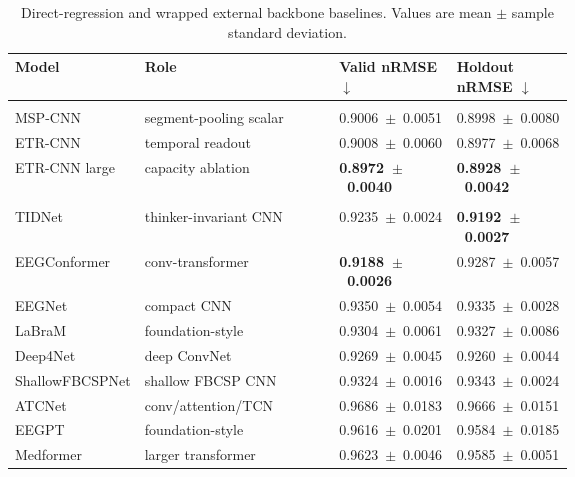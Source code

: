 \documentclass[12pt]{article}
\begin{document}
\begin{table}[!t]
\centering
\caption{Direct-regression and wrapped external backbone baselines. Values are mean $\pm$ sample standard deviation.}
\label{tab:r11_regression_baselines}
\footnotesize
\setlength{\tabcolsep}{2pt}
\renewcommand{\arraystretch}{1.15}
\begin{tabularx}{\linewidth}{@{} >{\RaggedRight\arraybackslash}p{0.22\linewidth} Y >{\centering\arraybackslash}p{0.215\linewidth} >{\centering\arraybackslash}p{0.215\linewidth} @{}}
\toprule
\textbf{Model} & \textbf{Role} & \textbf{Valid nRMSE} $\downarrow$ & \textbf{Holdout nRMSE} $\downarrow$ \\
\midrule
{} \\
\addlinespace[0.15em]
MSP-CNN & segment-pooling scalar & \mbox{0.9006 $\pm$ 0.0051} & \mbox{0.8998 $\pm$ 0.0080} \\
ETR-CNN & temporal readout & \mbox{0.9008 $\pm$ 0.0060} & \mbox{0.8977 $\pm$ 0.0068} \\
ETR-CNN large & capacity ablation & \textbf{\mbox{0.8972 $\pm$ 0.0040}} & \textbf{\mbox{0.8928 $\pm$ 0.0042}} \\
\midrule
{} \\
\addlinespace[0.15em]
TIDNet & thinker-invariant CNN & \mbox{0.9235 $\pm$ 0.0024} & \textbf{\mbox{0.9192 $\pm$ 0.0027}} \\
EEGConformer & conv-transformer & \textbf{\mbox{0.9188 $\pm$ 0.0026}} & \mbox{0.9287 $\pm$ 0.0057} \\
EEGNet & compact CNN & \mbox{0.9350 $\pm$ 0.0054} & \mbox{0.9335 $\pm$ 0.0028} \\
LaBraM & foundation-style & \mbox{0.9304 $\pm$ 0.0061} & \mbox{0.9327 $\pm$ 0.0086} \\
Deep4Net & deep ConvNet & \mbox{0.9269 $\pm$ 0.0045} & \mbox{0.9260 $\pm$ 0.0044} \\
ShallowFBCSPNet & shallow FBCSP CNN & \mbox{0.9324 $\pm$ 0.0016} & \mbox{0.9343 $\pm$ 0.0024} \\
ATCNet & conv/attention/TCN & \mbox{0.9686 $\pm$ 0.0183} & \mbox{0.9666 $\pm$ 0.0151} \\
EEGPT & foundation-style & \mbox{0.9616 $\pm$ 0.0201} & \mbox{0.9584 $\pm$ 0.0185} \\
Medformer & larger transformer & \mbox{0.9623 $\pm$ 0.0046} & \mbox{0.9585 $\pm$ 0.0051} \\
\bottomrule
\end{tabularx}
\end{table}
\end{document}
